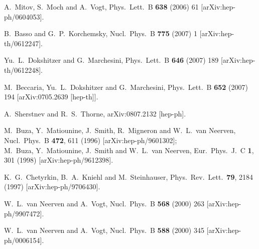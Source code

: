 \documentclass[12pt]{article}
\begin{document}
\begin{thebibliography}{99}
  A.~Mitov, S.~Moch and A.~Vogt,
  Phys.\ Lett.\  B {\bf 638} (2006) 61
  [arXiv:hep-ph/0604053].

  B.~Basso and G.~P.~Korchemsky,
  Nucl.\ Phys.\  B {\bf 775} (2007) 1
  [arXiv:hep-th/0612247].

  Yu.~L.~Dokshitzer and G.~Marchesini,
  Phys.\ Lett.\  B {\bf 646} (2007) 189
  [arXiv:hep-th/0612248].

  M.~Beccaria, Yu.~L.~Dokshitzer and G.~Marchesini,
  Phys.\ Lett.\  B {\bf 652} (2007) 194
  [arXiv:0705.2639 [hep-th]].

  A.~Sherstnev and R.~S.~Thorne,
  arXiv:0807.2132 [hep-ph].



  M.~Buza, Y.~Matiounine, J.~Smith, R.~Migneron and W.~L.~van Neerven,
  Nucl.\ Phys.\ B {\bf 472}, 611 (1996)
  [arXiv:hep-ph/9601302];\\
%
  M.~Buza, Y.~Matiounine, J.~Smith and W.~L.~van Neerven,
  Eur.\ Phys.\ J.\ C {\bf 1}, 301 (1998)
  [arXiv:hep-ph/9612398].

  K.~G.~Chetyrkin, B.~A.~Kniehl and M.~Steinhauser,
  Phys.\ Rev.\ Lett.\  {\bf 79}, 2184 (1997)
  [arXiv:hep-ph/9706430].

  W.~L.~van Neerven and A.~Vogt,
  Nucl.\ Phys.\ B {\bf 568} (2000) 263
  [arXiv:hep-ph/9907472].

  W.~L.~van Neerven and A.~Vogt,
  Nucl.\ Phys.\ B {\bf 588} (2000) 345
  [arXiv:hep-ph/0006154].


\end{thebibliography}
\end{document}
